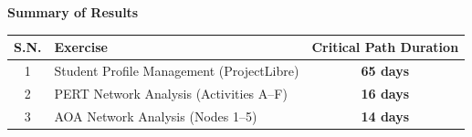 \documentclass[12pt,a4paper]{article}
\begin{document}
\vspace{0.2cm}
\noindent\textbf{Summary of Results}

\begin{center}
\renewcommand{\arraystretch}{1.3}
\begin{tabular}{|c|l|c|}
\hline
\textbf{S.N.} & \textbf{Exercise} & \textbf{Critical Path Duration} \\ \hline
1 & Student Profile Management (ProjectLibre) & \textbf{65 days} \\ \hline
2 & PERT Network Analysis (Activities A--F) & \textbf{16 days} \\ \hline
3 & AOA Network Analysis (Nodes 1--5) & \textbf{14 days} \\ \hline
\end{tabular}
\end{center}

\vspace{0.3cm}
\end{document}
